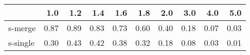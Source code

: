 \begin{tabular}{lrrrrrrrrr}
\toprule
{} &  1.0 &  1.2 &  1.4 &  1.6 &  1.8 &  2.0 &  3.0 &  4.0 &  5.0 \\
\midrule
s-merge  & 0.87 & 0.89 & 0.83 & 0.73 & 0.60 & 0.40 & 0.18 & 0.07 & 0.03 \\
s-single & 0.30 & 0.43 & 0.42 & 0.38 & 0.32 & 0.18 & 0.08 & 0.03 & 0.01 \\
\bottomrule
\end{tabular}
